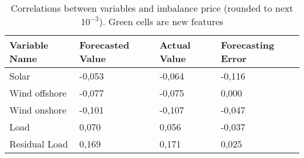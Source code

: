 \documentclass[class=scrbook, crop=false]{standalone}
\begin{document}
    \begin{table}
    \begin{tabular}{l|l|l|l}
    Variable Name &Forecasted Value& Actual Value& Forecasting Error \\\hline
    Solar &-0,053& -0,064& \cellcolor{green}  -0,116 \\
    Wind offshore & -0,077&-0,075& \cellcolor{green} 0,000 \\
    Wind onshore &-0,101&-0,107& \cellcolor{green} -0,047 \\
    Load &0,070&0,056& \cellcolor{green} -0,037 \\
    Residual Load & \cellcolor{green} 0,169& \cellcolor{green}0,171& \cellcolor{green}0,025\\
    \end{tabular}
    
    \caption{Correlations between variables and imbalance price (rounded to next $10^{-3}$). Green cells are new features}
    \label{Table::Rebap_Correlations_ENTSOE}
    \end{table}
\end{document}
